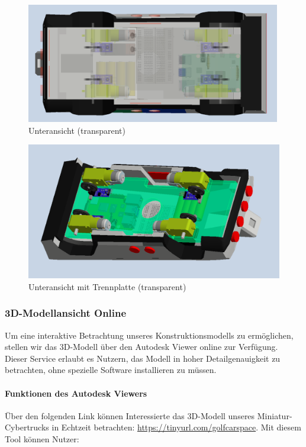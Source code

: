\begin{figure}[h]
    \centering
    \includegraphics[width=0.99\textwidth]{Resources/unten_transparent.png}
    \caption{Unteransicht (transparent)}
\end{figure}

\newpage

\begin{figure}[h]
    \centering
    \includegraphics[width=1\textwidth]{Resources/unten_trennplatte_transparent.png}
    \caption{Unteransicht mit Trennplatte (transparent)}
\end{figure}

\subsubsection{3D-Modellansicht Online}
Um eine interaktive Betrachtung unseres Konstruktionsmodells zu ermöglichen, stellen wir das 3D-Modell über den Autodesk Viewer online zur Verfügung. Dieser Service erlaubt es Nutzern, das Modell in hoher Detailgenauigkeit zu betrachten, ohne spezielle Software installieren zu müssen.

\paragraph{Funktionen des Autodesk Viewers}
Über den folgenden Link können Interessierte das 3D-Modell unseres Miniatur-Cybertrucks in Echtzeit betrachten: \newline \url{https://tinyurl.com/golfcarspace}.
\newline
Mit diesem Tool können Nutzer:


